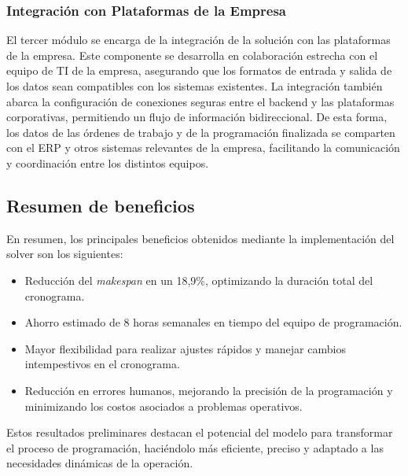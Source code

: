 \documentclass{article}
\begin{document}
\subsubsection{Integración con Plataformas de la Empresa}

El tercer módulo se encarga de la integración de la solución con las plataformas de la empresa. Este componente se desarrolla en colaboración estrecha con el equipo de TI de la empresa, asegurando que los formatos de entrada y salida de los datos sean compatibles con los sistemas existentes. La integración también abarca la configuración de conexiones seguras entre el backend y las plataformas corporativas, permitiendo un flujo de información bidireccional. De esta forma, los datos de las órdenes de trabajo y de la programación finalizada se comparten con el ERP y otros sistemas relevantes de la empresa, facilitando la comunicación y coordinación entre los distintos equipos.



\subsection{Resumen de beneficios}

En resumen, los principales beneficios obtenidos mediante la implementación del solver son los siguientes:
\begin{itemize}
    \item Reducción del \textit{makespan} en un 18,9\%, optimizando la duración total del cronograma.
    \item Ahorro estimado de 8 horas semanales en tiempo del equipo de programación.
    \item Mayor flexibilidad para realizar ajustes rápidos y manejar cambios intempestivos en el cronograma.
    \item Reducción en errores humanos, mejorando la precisión de la programación y minimizando los costos asociados a problemas operativos.
\end{itemize}

Estos resultados preliminares destacan el potencial del modelo para transformar el proceso de programación, haciéndolo más eficiente, preciso y adaptado a las necesidades dinámicas de la operación.
\end{document}
